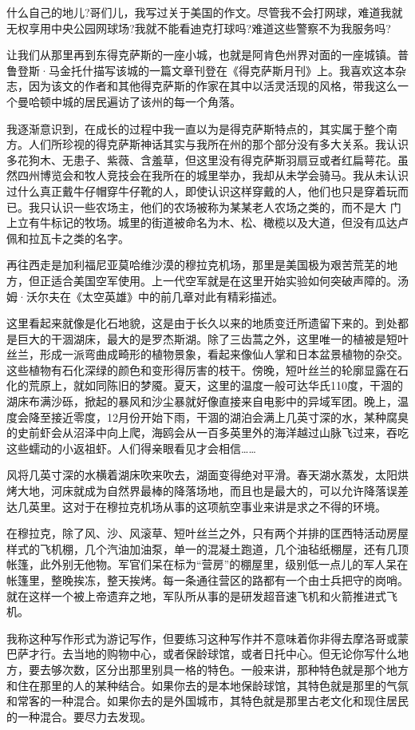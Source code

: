 什么自己的地儿?哥们儿，我写过关于美国的作文。尽管我不会打网球，难道我就无权享用中央公园网球场?我就不能看迪克打球吗?难道这些警察不为我服务吗?

让我们从那里再到东得克萨斯的一座小城，也就是阿肯色州界对面的一座城镇。普鲁登斯·马金托什描写该城的一篇文章刊登在《得克萨斯月刊》上。我喜欢这本杂志，因为该文的作者和其他得克萨斯的作家在其中以活灵活现的风格，带我这么一个曼哈顿中城的居民遍访了该州的每一个角落。

我逐渐意识到，在成长的过程中我一直以为是得克萨斯特点的，其实属于整个南方。人们所珍视的得克萨斯神话其实与我所在州的那个部分没有多大关系。我认识多花狗木、无患子、紫薇、含羞草，但这里没有得克萨斯羽扇豆或者红扁萼花。虽然四州博览会和牧人竞技会在我所在的城里举办，我却从未学会骑马。我从未认识过什么真正戴牛仔帽穿牛仔靴的人，即使认识这样穿戴的人，他们也只是穿着玩而已。我只认识一些农场主，他们的农场被称为某某老人农场之类的，而不是大 门上立有牛标记的牧场。城里的街道被命名为木、松、橄榄以及大道，但没有瓜达卢佩和拉瓦卡之类的名字。

再往西走是加利福尼亚莫哈维沙漠的穆拉克机场，那里是美国极为艰苦荒芜的地方，但正适合美国空军使用。上一代空军就是在这里开始实验如何突破声障的。汤姆·沃尔夫在《太空英雄》中的前几章对此有精彩描述。

这里看起来就像是化石地貌，这是由于长久以来的地质变迁所遗留下来的。到处都是巨大的干涸湖床，最大的是罗杰斯湖。除了三齿蒿之外，这里唯一的植被是短叶丝兰，形成一派弯曲成畸形的植物景象，看起来像仙人掌和日本盆景植物的杂交。这些植物有石化深绿的颜色和变形得厉害的枝干。傍晚，短叶丝兰的轮廓显露在石化的荒原上，就如同陈旧的梦魇。夏天，这里的温度一般可达华氏110度，干涸的湖床布满沙砾，掀起的暴风和沙尘暴就好像直接来自电影中的异域军团。晚上，温度会降至接近零度，12月份开始下雨，干涸的湖泊会满上几英寸深的水，某种腐臭的史前虾会从沼泽中向上爬，海鸥会从一百多英里外的海洋越过山脉飞过来，吞吃这些蠕动的小返祖虾。人们得亲眼看见才会相信……

风将几英寸深的水横着湖床吹来吹去，湖面变得绝对平滑。春天湖水蒸发，太阳烘烤大地，河床就成为自然界最棒的降落场地，而且也是最大的，可以允许降落误差达几英里。这对于在穆拉克机场从事的这项航空事业来讲是求之不得的环境。

在穆拉克，除了风、沙、风滚草、短叶丝兰之外，只有两个并排的匡西特活动房屋样式的飞机棚，几个汽油加油泵，单一的混凝土跑道，几个油毡纸棚屋，还有几顶帐篷，此外别无他物。军官们呆在标为“营房”的棚屋里，级别低一点儿的军人呆在帐篷里，整晚挨冻，整天挨烤。每一条通往营区的路都有一个由士兵把守的岗哨。就在这样一个被上帝遗弃之地，军队所从事的是研发超音速飞机和火箭推进式飞机。

我称这种写作形式为游记写作，但要练习这种写作并不意味着你非得去摩洛哥或蒙巴萨才行。去当地的购物中心，或者保龄球馆，或者日托中心。但无论你写什么地方，要去够次数，区分出那里别具一格的特色。一般来讲，那种特色就是那个地方和住在那里的人的某种结合。如果你去的是本地保龄球馆，其特色就是那里的气氛和常客的一种混合。如果你去的是外国城市，其特色就是那里古老文化和现住居民的一种混合。要尽力去发现。

